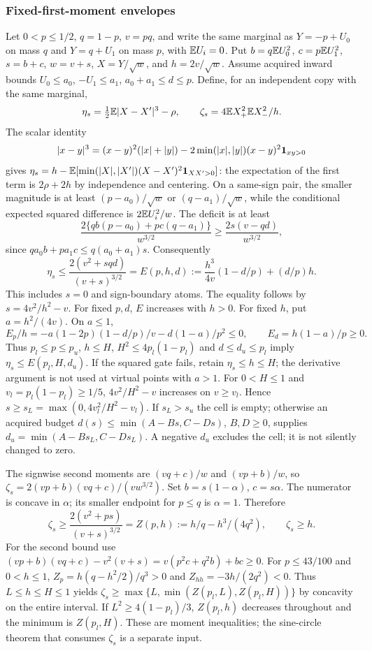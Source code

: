\subsubsection{Fixed-first-moment envelopes}\label{ms:finite:fixed-h}
Let $0<p\le1/2$, $q=1-p$, $v=pq$, and write the same marginal as
$Y=-p+U_0$ on mass $q$ and $Y=q+U_1$ on mass $p$, with $\mathbb E U_i=0$.
Put $b=q\mathbb E U_0^2$, $c=p\mathbb E U_1^2$, $s=b+c$, $w=v+s$,
$X=Y/\sqrt w$, and $h=2v/\sqrt w$. Assume acquired inward bounds
$U_0\le a_0$, $-U_1\le a_1$, $a_0+a_1\le d\le p$. Define, for
an independent copy with the same marginal,
\[
 \eta_s=\tfrac12\mathbb E|X-X'|^3-\rho,\qquad
 \zeta_s=4\mathbb E X_+^2\mathbb E X_-^2/h.
\]
The scalar identity
\[
 |x-y|^3=(x-y)^2(|x|+|y|)
 -2\min(|x|,|y|)(x-y)^2\mathbf 1_{xy>0}
\]
gives $\eta_s=h-\mathbb E[\min(|X|,|X'|)(X-X')^2\mathbf 1_{XX'>0}]$:
the expectation of the first term is $2\rho+2h$ by independence and
centering. On a same-sign pair, the smaller magnitude is at least
$(p-a_0)/\sqrt w$ or $(q-a_1)/\sqrt w$, while the conditional
expected squared difference is $2\mathbb E U_i^2/w$. The deficit is at least
\[
 \frac{2\{qb(p-a_0)+pc(q-a_1)\}}{w^{3/2}}
 \ge\frac{2s(v-qd)}{w^{3/2}},
\]
since $qa_0b+pa_1c\le q(a_0+a_1)s$. Consequently
\begin{equation}\label{ms:finite:eta-fixedh}
 \eta_s\le\frac{2(v^2+sqd)}{(v+s)^{3/2}}
 =E(p,h,d):=\frac{h^3}{4v}(1-d/p)+(d/p)h.
\end{equation}
This includes $s=0$ and sign-boundary atoms. The equality follows by
$s=4v^2/h^2-v$. For fixed $p,d$, $E$ increases with $h>0$. For fixed
$h$, put $a=h^2/(4v)$. On $a\le1$,
\[
 E_p/h=-a(1-2p)(1-d/p)/v-d(1-a)/p^2\le0,
 \qquad E_d=h(1-a)/p\ge0.
\]
Thus $p_l\le p\le p_u$, $h\le H$, $H^2\le4p_l(1-p_l)$ and
$d\le d_u\le p_l$ imply $\eta_s\le E(p_l,H,d_u)$. If the squared
gate fails, retain $\eta_s\le h\le H$; the derivative argument is
not used at virtual points with $a>1$.
For $0<H\le1$ and $v_l=p_l(1-p_l)\ge1/5$, $4v^2/H^2-v$ increases
on $v\ge v_l$. Hence $s\ge s_L=\max(0,4v_l^2/H^2-v_l)$.
If $s_L>s_u$ the cell is empty; otherwise an acquired budget
$d(s)\le\min(A-Bs,C-Ds)$, $B,D\ge0$, supplies
$d_u=\min(A-Bs_L,C-Ds_L)$. A negative $d_u$ excludes the cell;
it is not silently changed to zero.

The signwise second moments are $(vq+c)/w$ and $(vp+b)/w$, so
$\zeta_s=2(vp+b)(vq+c)/(vw^{3/2})$. Set $b=s(1-\alpha)$,
$c=s\alpha$. The numerator is concave in $\alpha$; its smaller
endpoint for $p\le q$ is $\alpha=1$. Therefore
\begin{equation}\label{ms:finite:zeta-fixedh}
 \zeta_s\ge\frac{2(v^2+ps)}{(v+s)^{3/2}}
 =Z(p,h):=h/q-h^3/(4q^2),\qquad \zeta_s\ge h.
\end{equation}
For the second bound use
$(vp+b)(vq+c)-v^2(v+s)=v(p^2c+q^2b)+bc\ge0$.
For $p\le43/100$ and $0<h\le1$, $Z_p=h(q-h^2/2)/q^3>0$ and
$Z_{hh}=-3h/(2q^2)<0$. Thus $L\le h\le H\le1$ yields
$\zeta_s\ge\max\{L,\min(Z(p_l,L),Z(p_l,H))\}$ by concavity on
the entire interval. If $L^2\ge4(1-p_l)/3$, $Z(p_l,h)$ decreases
throughout and the minimum is $Z(p_l,H)$. These are moment inequalities;
the sine-circle theorem that consumes $\zeta_s$ is a separate input.

